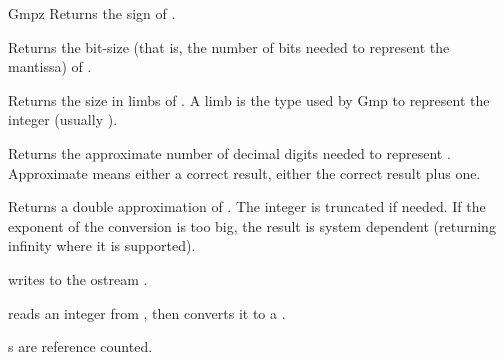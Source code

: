 \begin{ccRefClass} {Gmpz}
        {Returns the sign of \ccVar.}

        {Returns the bit-size (that is, the number of bits needed to
        represent the mantissa) of \ccVar.}

        {Returns the size in limbs of \ccVar. A limb is the type used by
        {\sc Gmp} to represent the integer (usually ).}

        {Returns the approximate number of decimal digits needed to
        represent \ccVar. Approximate means either a correct result, either
        the correct result plus one.}

        {Returns a double approximation of \ccVar. The integer is truncated
        if needed. If the exponent of the conversion is too big, the result
        is system dependent (returning infinity where it is supported).}

{writes  to the ostream .}\ccGlue

{reads an integer from , then converts it to a .}

\ccImplementation
{}s are reference counted.

\end{ccRefClass}
